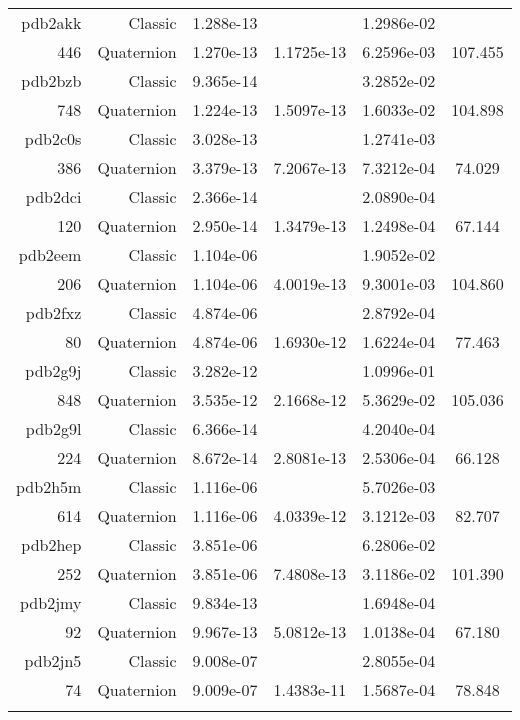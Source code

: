 \begin{xltabular}{\textwidth}{r|rS[table-format=1.3e+2]S[table-format=1.4e+2]S[table-format=1.4e+2]S[table-format=-1.3]}
pdb2akk & Classic & 1.288e-13 &  & 1.2986e-02 & \\
446 & Quaternion & 1.270e-13 & 1.1725e-13 & 6.2596e-03 & 107.455\\  \addlinespace
pdb2bzb & Classic & 9.365e-14 &  & 3.2852e-02 & \\
748 & Quaternion & 1.224e-13 & 1.5097e-13 & 1.6033e-02 & 104.898\\  \addlinespace
pdb2c0s & Classic & 3.028e-13 &  & 1.2741e-03 & \\
386 & Quaternion & 3.379e-13 & 7.2067e-13 & 7.3212e-04 & 74.029\\  \addlinespace
pdb2dci & Classic & 2.366e-14 &  & 2.0890e-04 & \\
120 & Quaternion & 2.950e-14 & 1.3479e-13 & 1.2498e-04 & 67.144\\  \addlinespace
pdb2eem & Classic & 1.104e-06 &  & 1.9052e-02 & \\
206 & Quaternion & 1.104e-06 & 4.0019e-13 & 9.3001e-03 & 104.860\\  \addlinespace
pdb2fxz & Classic & 4.874e-06 &  & 2.8792e-04 & \\
80 & Quaternion & 4.874e-06 & 1.6930e-12 & 1.6224e-04 & 77.463\\  \addlinespace
pdb2g9j & Classic & 3.282e-12 &  & 1.0996e-01 & \\
848 & Quaternion & 3.535e-12 & 2.1668e-12 & 5.3629e-02 & 105.036\\  \addlinespace
pdb2g9l & Classic & 6.366e-14 &  & 4.2040e-04 & \\
224 & Quaternion & 8.672e-14 & 2.8081e-13 & 2.5306e-04 & 66.128\\  \addlinespace
pdb2h5m & Classic & 1.116e-06 &  & 5.7026e-03 & \\
614 & Quaternion & 1.116e-06 & 4.0339e-12 & 3.1212e-03 & 82.707\\  \addlinespace
pdb2hep & Classic & 3.851e-06 &  & 6.2806e-02 & \\
252 & Quaternion & 3.851e-06 & 7.4808e-13 & 3.1186e-02 & 101.390\\  \addlinespace
pdb2jmy & Classic & 9.834e-13 &  & 1.6948e-04 & \\
92 & Quaternion & 9.967e-13 & 5.0812e-13 & 1.0138e-04 & 67.180\\  \addlinespace
pdb2jn5 & Classic & 9.008e-07 &  & 2.8055e-04 & \\
74 & Quaternion & 9.009e-07 & 1.4383e-11 & 1.5687e-04 & 78.848\\  \addlinespace

\end{xltabular}
